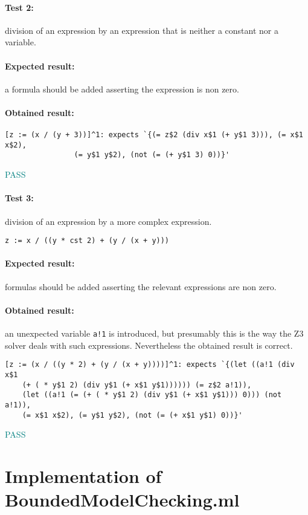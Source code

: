 \documentclass[letterpaper,12pt]{article}
\begin{document}
\paragraph{Test 2:}division of an expression by an expression that is neither a constant nor a variable.
\paragraph{Expected result:}a formula should be added asserting the expression is non zero.
\paragraph{Obtained result:}
\begin{verbatim}
[z := (x / (y + 3))]^1: expects `{(= z$2 (div x$1 (+ y$1 3))), (= x$1 x$2),
				(= y$1 y$2), (not (= (+ y$1 3) 0))}'
\end{verbatim}
\textcolor{teal}{PASS}

\paragraph{Test 3:}division of an expression by a more complex expression.
\begin{verbatim}
z := x / ((y * cst 2) + (y / (x + y))) 
\end{verbatim}
\paragraph{Expected result:}formulas should be added asserting the relevant expressions are non zero.
\paragraph{Obtained result:}an unexpected variable \texttt{a!1} is introduced, but presumably this is the way the Z3 solver deals with such expressions. Nevertheless the obtained result is correct.
\begin{verbatim}
[z := (x / ((y * 2) + (y / (x + y))))]^1: expects `{(let ((a!1 (div x$1 
	(+ ( * y$1 2) (div y$1 (+ x$1 y$1)))))) (= z$2 a!1)),
    (let ((a!1 (= (+ ( * y$1 2) (div y$1 (+ x$1 y$1))) 0))) (not a!1)),
    (= x$1 x$2), (= y$1 y$2), (not (= (+ x$1 y$1) 0))}'
\end{verbatim}

\textcolor{teal}{PASS}


\section{Implementation of BoundedModelChecking.ml}
\end{document}
